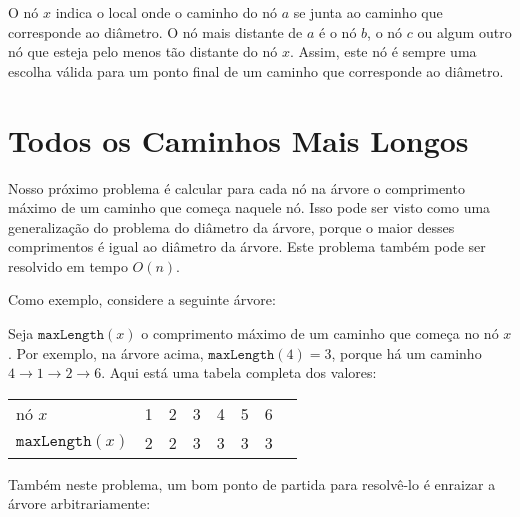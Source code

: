O nó $x$ indica o local onde o caminho do nó $a$ se junta ao caminho que corresponde ao diâmetro. O nó mais distante de $a$ é o nó $b$, o nó $c$ ou algum outro nó que esteja pelo menos tão distante do nó $x$. Assim, este nó é sempre uma escolha válida para um ponto final de um caminho que corresponde ao diâmetro.

\section{Todos os Caminhos Mais Longos}

Nosso próximo problema é calcular para cada nó na árvore o comprimento máximo de um caminho que começa naquele nó. Isso pode ser visto como uma generalização do problema do diâmetro da árvore, porque o maior desses comprimentos é igual ao diâmetro da árvore. Este problema também pode ser resolvido em tempo $O(n)$.

Como exemplo, considere a seguinte árvore:
\begin{center}
\end{center}

Seja $\texttt{maxLength}(x)$ o comprimento máximo de um caminho que começa no nó $x$. Por exemplo, na árvore acima, $\texttt{maxLength}(4)=3$, porque há um caminho $4 \rightarrow 1 \rightarrow 2 \rightarrow 6$. Aqui está uma tabela completa dos valores:
\begin{center}
\begin{tabular}{l|lllllll}
nó $x$ & 1 & 2 & 3 & 4 & 5 & 6 \\
$\texttt{maxLength}(x)$ & 2 & 2 & 3 & 3 & 3 & 3 \\
\end{tabular}
\end{center}

Também neste problema, um bom ponto de partida para resolvê-lo é enraizar a árvore arbitrariamente:
\begin{center}
\end{center}

